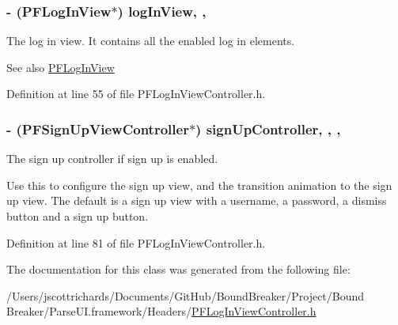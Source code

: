 \hypertarget{interface_p_f_log_in_view_controller_a705c69f6a99cfaf962831623b4d6ccff}{}
\subsubsection[{log\+In\+View}]{\setlength{\rightskip}{0pt plus 5cm}-\/ ({\bf P\+F\+Log\+In\+View}$\ast$) log\+In\+View\hspace{0.3cm}{\ttfamily [read]}, {\ttfamily [nonatomic]}, {\ttfamily [strong]}}\label{interface_p_f_log_in_view_controller_a705c69f6a99cfaf962831623b4d6ccff}
The log in view. It contains all the enabled log in elements.

\begin{DoxySeeAlso}{See also}
\hyperlink{interface_p_f_log_in_view}{P\+F\+Log\+In\+View} 
\end{DoxySeeAlso}


Definition at line 55 of file P\+F\+Log\+In\+View\+Controller.\+h.

\hypertarget{interface_p_f_log_in_view_controller_a3b23bb61ef95e3e9418f2f6d29420425}{}
\subsubsection[{sign\+Up\+Controller}]{\setlength{\rightskip}{0pt plus 5cm}-\/ ({\bf P\+F\+Sign\+Up\+View\+Controller}$\ast$) sign\+Up\+Controller\hspace{0.3cm}{\ttfamily [read]}, {\ttfamily [write]}, {\ttfamily [nonatomic]}, {\ttfamily [strong]}}\label{interface_p_f_log_in_view_controller_a3b23bb61ef95e3e9418f2f6d29420425}
The sign up controller if sign up is enabled.

Use this to configure the sign up view, and the transition animation to the sign up view. The default is a sign up view with a username, a password, a dismiss button and a sign up button. 

Definition at line 81 of file P\+F\+Log\+In\+View\+Controller.\+h.



The documentation for this class was generated from the following file\+:\begin{DoxyCompactItemize}
\item 
/\+Users/jscottrichards/\+Documents/\+Git\+Hub/\+Bound\+Breaker/\+Project/\+Bound Breaker/\+Parse\+U\+I.\+framework/\+Headers/\hyperlink{_p_f_log_in_view_controller_8h}{P\+F\+Log\+In\+View\+Controller.\+h}\end{DoxyCompactItemize}
